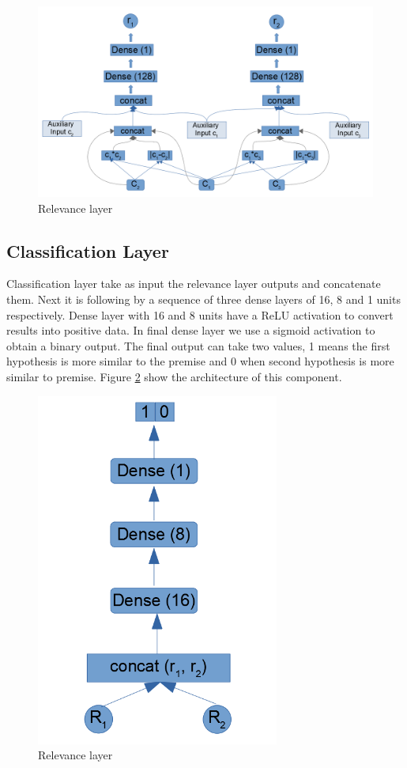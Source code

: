 \documentclass[12pt]{report}
\begin{document}
\begin{figure}[H]	
	\centering
	\includegraphics[width=150mm, scale = 1]{images/14_relevance.png}	
	\caption{Relevance layer}	
	\label{figure:relevance}
\end{figure}

\subsection{Classification Layer}

Classification layer take as input the relevance layer outputs and concatenate them. Next it is following by a sequence of three dense layers of 16, 8 and 1 units respectively. Dense layer with 16 and 8 units have a \ac{ReLU} activation to convert results into positive data. In final dense layer we use a sigmoid activation to obtain a binary output. The final output can take two values, 1 means the first hypothesis is more similar to the premise and 0 when second hypothesis is more similar to premise. Figure \ref{figure:classification} show the architecture of this component.

\begin{figure}[H]	
	\centering
	\includegraphics[width=80mm, scale = 1]{images/15_classification.png}	
	\caption{Relevance layer}	
	\label{figure:classification}
\end{figure}
\end{document}
